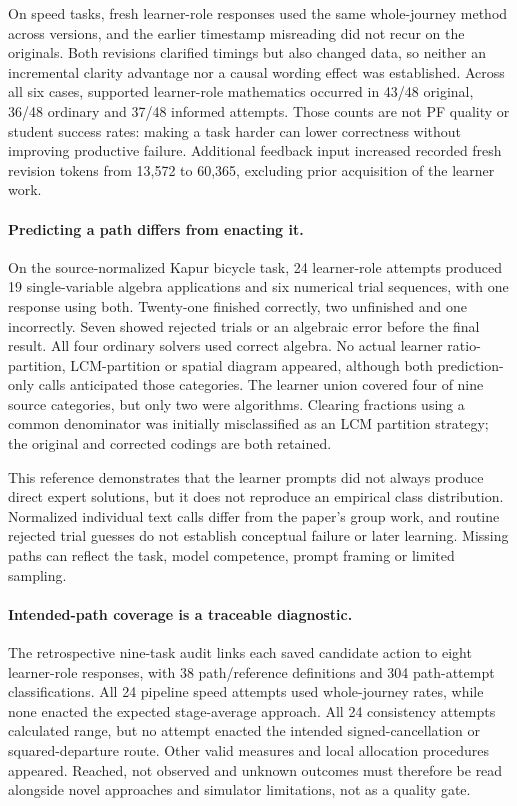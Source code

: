 On speed tasks, fresh learner-role responses used the same whole-journey method across versions, and the earlier timestamp misreading did not recur on the originals. Both revisions clarified timings but also changed data, so neither an incremental clarity advantage nor a causal wording effect was established. Across all six cases, supported learner-role mathematics occurred in 43/48 original, 36/48 ordinary and 37/48 informed attempts. Those counts are not PF quality or student success rates: making a task harder can lower correctness without improving productive failure. Additional feedback input increased recorded fresh revision tokens from 13,572 to 60,365, excluding prior acquisition of the learner work.

\paragraph{Predicting a path differs from enacting it.}
On the source-normalized Kapur bicycle task, 24 learner-role attempts produced 19 single-variable algebra applications and six numerical trial sequences, with one response using both. Twenty-one finished correctly, two unfinished and one incorrectly. Seven showed rejected trials or an algebraic error before the final result. All four ordinary solvers used correct algebra. No actual learner ratio-partition, LCM-partition or spatial diagram appeared, although both prediction-only calls anticipated those categories. The learner union covered four of nine source categories, but only two were algorithms. Clearing fractions using a common denominator was initially misclassified as an LCM partition strategy; the original and corrected codings are both retained.

This reference demonstrates that the learner prompts did not always produce direct expert solutions, but it does not reproduce an empirical class distribution. Normalized individual text calls differ from the paper's group work, and routine rejected trial guesses do not establish conceptual failure or later learning. Missing paths can reflect the task, model competence, prompt framing or limited sampling.

\paragraph{Intended-path coverage is a traceable diagnostic.}
The retrospective nine-task audit links each saved candidate action to eight learner-role responses, with 38 path/reference definitions and 304 path-attempt classifications. All 24 pipeline speed attempts used whole-journey rates, while none enacted the expected stage-average approach. All 24 consistency attempts calculated range, but no attempt enacted the intended signed-cancellation or squared-departure route. Other valid measures and local allocation procedures appeared. Reached, not observed and unknown outcomes must therefore be read alongside novel approaches and simulator limitations, not as a quality gate.

